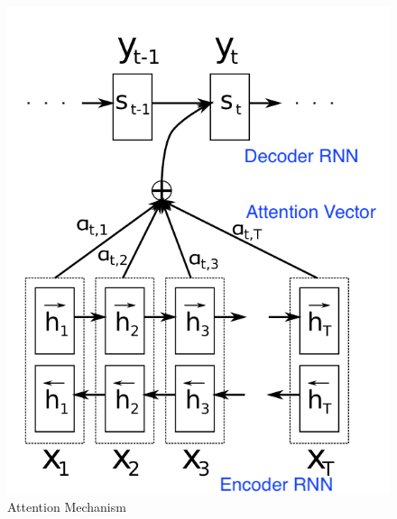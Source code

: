 \message{ !name(usyd_phd_proposal.tex)}\documentclass{article} \usepackage{tabularx}
\begin{document}
\begin{figure}
  \centering
  \includegraphics[scale=0.5]{images/attention.png}
  \caption{Attention Mechanism}
  \label{fig:attention}
\end{figure}
\end{document}
